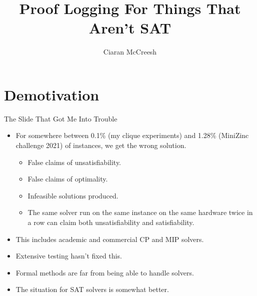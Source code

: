 \documentclass{beamer}
\author{Ciaran McCreesh}
\title{Proof Logging For Things That Aren't SAT}
\begin{document}
{
    \begin{frame}
        \titlepage
    \end{frame}
}

\section{Demotivation}

\begin{frame}{The Slide That Got Me Into Trouble}
    \begin{itemize}
        \item For somewhere between 0.1\% (my clique experiments) and 1.28\% (MiniZinc challenge
            2021) of instances, we get the wrong solution.
            \begin{itemize}
                \item False claims of unsatisfiability.
                \item False claims of optimality.
                \item Infeasible solutions produced.
                \item The same solver run on the same instance on the same hardware twice in a row
                    can claim both unsatisfiability and satisfiability.
            \end{itemize}
        \item This includes academic and commercial CP and MIP solvers.
        \item Extensive testing hasn't fixed this.
        \item Formal methods are far from being able to handle solvers.
        \item The situation for SAT solvers is somewhat better.
    \end{itemize}
\end{frame}
\end{document}
